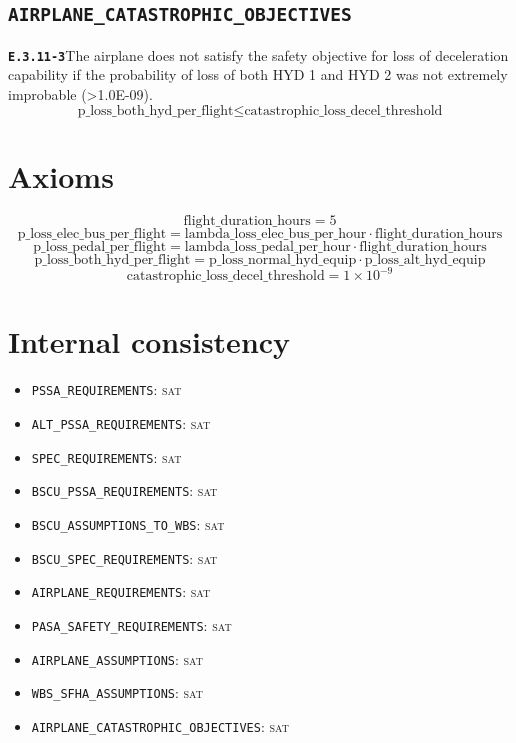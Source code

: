 \documentclass[11pt,a4paper]{article}
\begin{document}
\subsection*{\texttt{AIRPLANE\_CATASTROPHIC\_OBJECTIVES}}
\noindent\textbf{\texttt{E.3.11-3}}\quad The airplane does not satisfy the safety objective for loss of deceleration capability if the probability of loss of both HYD 1 and HYD 2 was not extremely improbable (>1.0E-09).
\begin{dmath*}
\text{p\_loss\_both\_hyd\_per\_flight} \leq \text{catastrophic\_loss\_decel\_threshold}
\end{dmath*}
\section{Axioms}
\begin{dmath*}
\text{flight\_duration\_hours} = 5
\end{dmath*}
\begin{dmath*}
\text{p\_loss\_elec\_bus\_per\_flight} = \text{lambda\_loss\_elec\_bus\_per\_hour} \cdot \text{flight\_duration\_hours}
\end{dmath*}
\begin{dmath*}
\text{p\_loss\_pedal\_per\_flight} = \text{lambda\_loss\_pedal\_per\_hour} \cdot \text{flight\_duration\_hours}
\end{dmath*}
\begin{dmath*}
\text{p\_loss\_both\_hyd\_per\_flight} = \text{p\_loss\_normal\_hyd\_equip} \cdot \text{p\_loss\_alt\_hyd\_equip}
\end{dmath*}
\begin{dmath*}
\text{catastrophic\_loss\_decel\_threshold} = 1 \times 10^{-9}
\end{dmath*}
\section{Internal consistency}
\begin{itemize}
\item \texttt{PSSA\_REQUIREMENTS}: \textsc{sat}
\item \texttt{ALT\_PSSA\_REQUIREMENTS}: \textsc{sat}
\item \texttt{SPEC\_REQUIREMENTS}: \textsc{sat}
\item \texttt{BSCU\_PSSA\_REQUIREMENTS}: \textsc{sat}
\item \texttt{BSCU\_ASSUMPTIONS\_TO\_WBS}: \textsc{sat}
\item \texttt{BSCU\_SPEC\_REQUIREMENTS}: \textsc{sat}
\item \texttt{AIRPLANE\_REQUIREMENTS}: \textsc{sat}
\item \texttt{PASA\_SAFETY\_REQUIREMENTS}: \textsc{sat}
\item \texttt{AIRPLANE\_ASSUMPTIONS}: \textsc{sat}
\item \texttt{WBS\_SFHA\_ASSUMPTIONS}: \textsc{sat}
\item \texttt{AIRPLANE\_CATASTROPHIC\_OBJECTIVES}: \textsc{sat}
\end{itemize}
\end{document}
